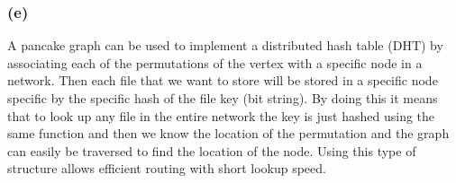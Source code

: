 \documentclass{article}
\begin{document}
\subsubsection*{(e)}
A pancake graph can be used to implement a distributed hash table (DHT) by associating each of the permutations of the vertex with a specific node in a network. Then each file that we want to store will be stored in a specific node specific by the specific hash of the file key (bit string). By doing this it means that to look up any file in the entire network the key is just hashed using the same function and then we know the location of the permutation and the graph can easily be traversed to find the location of the node. Using this type of structure allows efficient routing with short lookup speed.

\newpage
\printbibliography
\end{document}

